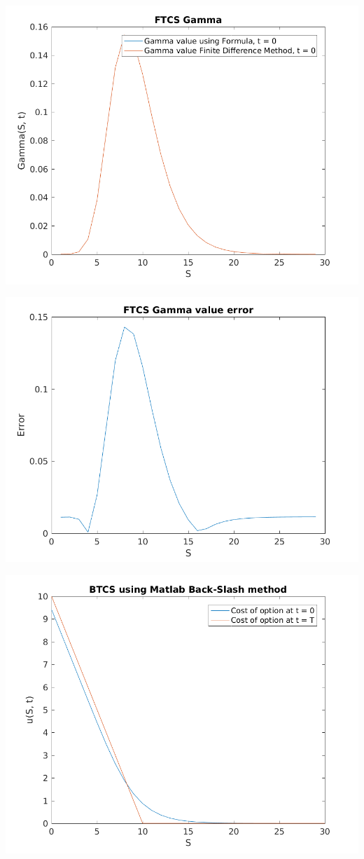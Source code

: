 \documentclass{article}
\begin{document}
\includegraphics{"q2_10"}
\pagebreak


\includegraphics{"q2_11"}
\pagebreak


\includegraphics{"q2_12"}
\pagebreak
\end{document}
